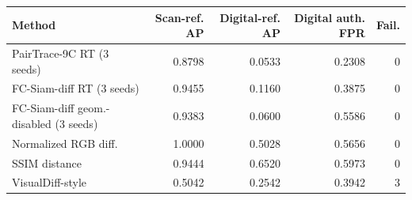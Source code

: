\begin{tabular}{lrrrr}
\toprule
Method & Scan-ref. AP & Digital-ref. AP & Digital auth. FPR & Fail. \\
\midrule
PairTrace-9C RT (3 seeds) & 0.8798 & 0.0533 & 0.2308 & 0 \\
FC-Siam-diff RT (3 seeds) & 0.9455 & 0.1160 & 0.3875 & 0 \\
FC-Siam-diff geom.-disabled (3 seeds) & 0.9383 & 0.0600 & 0.5586 & 0 \\
Normalized RGB diff. & 1.0000 & 0.5028 & 0.5656 & 0 \\
SSIM distance & 0.9444 & 0.6520 & 0.5973 & 0 \\
VisualDiff-style & 0.5042 & 0.2542 & 0.3942 & 3 \\
\bottomrule
\end{tabular}
